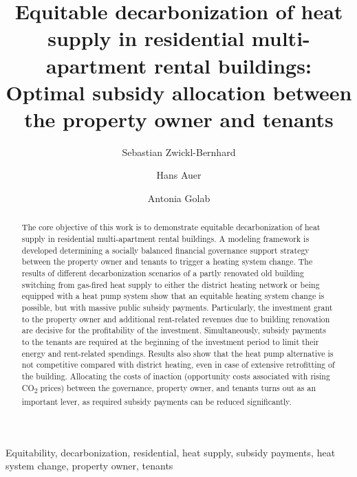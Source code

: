 \documentclass[review]{elsarticle}
\begin{document}
\begin{frontmatter}

\title{Equitable decarbonization of heat supply in residential multi-apartment rental buildings: Optimal subsidy allocation between the property owner and tenants}
\author[1]{Sebastian Zwickl-Bernhard}
\author[1]{Hans Auer}
\author[1]{Antonia Golab}
\address[1]{Energy Economics Group (EEG), Technische Universität Wien, Gusshausstrasse 25-29/E370-3, 1040 Wien, Austria}

\begin{abstract}
	The core objective of this work is to demonstrate equitable decarbonization of heat supply in residential multi-apartment rental buildings. A modeling framework is developed determining a socially balanced financial governance support strategy between the property owner and tenants to trigger a heating system change. The results of different decarbonization scenarios of a partly renovated old building switching from gas-fired heat supply to either the district heating network or being equipped with a heat pump system show that an equitable heating system change is possible, but with massive public subsidy payments. Particularly, the investment grant to the property owner and additional rent-related revenues due to building renovation are decisive for the profitability of the investment. Simultaneously, subsidy payments to the tenants are required at the beginning of the investment period to limit their energy and rent-related spendings. Results also show that the heat pump alternative is not competitive compared with district heating, even in case of extensive retrofitting of the building. Allocating the costs of inaction (opportunity costs associated with rising CO\textsubscript{2} prices) between the governance, property owner, and tenants turns out as an important lever, as required subsidy payments can be reduced significantly.
\end{abstract}

\begin{keyword}
	Equitability, decarbonization, residential, heat supply, subsidy payments, heat system change, property owner, tenants
	
\end{keyword}
\end{frontmatter}
\end{document}
